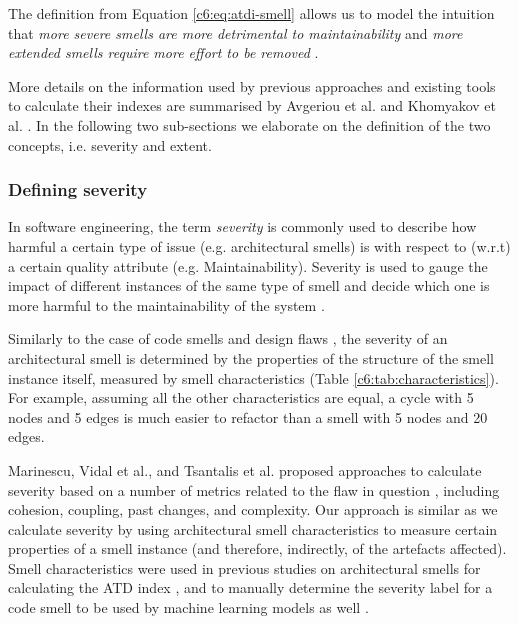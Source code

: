 The definition from Equation \ref{c6:eq:atdi-smell} allows us to model the intuition that \emph{more severe smells are more detrimental to maintainability} \cite{Roveda2018} and \emph{more extended smells require more effort to be removed} \cite{Nugroho2011}. 

More details on the information used by previous approaches and existing tools to calculate their indexes are summarised by Avgeriou et al. and Khomyakov et al. \cite{Avgeriou2021,Khomyakov2020}.
In the following two sub-sections we elaborate on the definition of the two concepts, i.e. severity and extent.

\subsubsection{Defining severity}\label{c6:sec:approach-definition-severity}
In software engineering, the term \emph{severity} is commonly used to describe how harmful a certain type of issue (e.g. architectural smells) is with respect to (w.r.t) a certain quality attribute (e.g. Maintainability).
Severity is used to gauge the impact of different instances of the same type of smell and decide which one is more harmful to the maintainability of the system \cite{Marinescu2012}.

Similarly to the case of code smells \cite{Arcelli2017b, Arcelli2015b} and design flaws \cite{Marinescu2012}, the severity of an architectural smell is determined by the properties of the structure of the smell instance itself, measured by smell characteristics \cite{Sas2019} (Table \ref*{c6:tab:characteristics}).
For example, assuming all the other characteristics are equal, a cycle with 5 nodes and 5 edges is much easier to refactor than a smell with 5 nodes and 20 edges.

Marinescu, Vidal et al., and Tsantalis et al. proposed approaches to calculate severity based on a number of metrics related to the flaw in question \cite{Marinescu2012, Vidal2016,Tsantalis2011}, including cohesion, coupling, past changes, and complexity.
Our approach is similar as we calculate severity by using architectural smell characteristics \cite{Sas2019} to measure certain properties of a smell instance (and therefore, indirectly, of the artefacts affected).
Smell characteristics were used in previous studies on architectural smells for calculating the ATD index  \cite{Roveda2018}, and to manually determine the severity label for a code smell to be used by machine learning models as well \cite{Arcelli2017b}.

